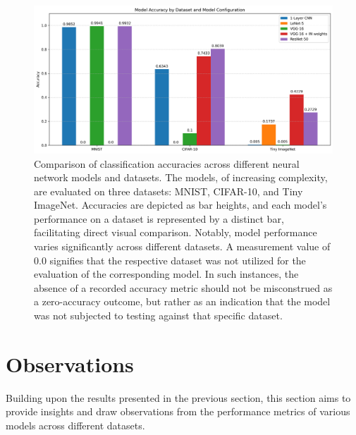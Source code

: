 \documentclass[letterpaper]{article}
\begin{document}
\begin{figure}
    \centering
    \includegraphics[width=0.8\linewidth]{accuracy_comparison.png}
    \caption{Comparison of classification accuracies across different neural network models and datasets. The models, of increasing complexity, are evaluated on three datasets: MNIST, CIFAR-10, and Tiny ImageNet. Accuracies are depicted as bar heights, and each model's performance on a dataset is represented by a distinct bar, facilitating direct visual comparison. Notably, model performance varies significantly across different datasets. A measurement value of 0.0 signifies that the respective dataset was not utilized for the evaluation of the corresponding model. In such instances, the absence of a recorded accuracy metric should not be misconstrued as a zero-accuracy outcome, but rather as an indication that the model was not subjected to testing against that specific dataset.}
    \label{fig:accuracycomparison}
\end{figure}

\section{Observations}
Building upon the results presented in the previous section, this section aims to provide insights and draw observations from the performance metrics of various models across different datasets.
\end{document}
